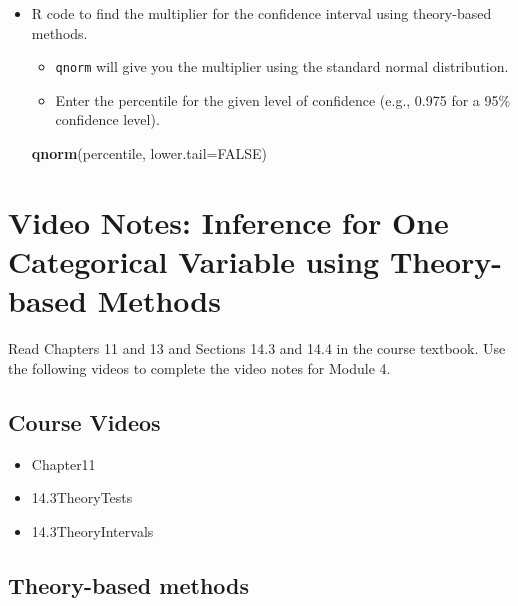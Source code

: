 \documentclass[
]{report}
\newenvironment{Shaded}{\begin{snugshade}}{\end{snugshade}}
\newcommand{\AttributeTok}[1]{\textcolor[rgb]{0.13,0.29,0.53}{#1}}
\newcommand{\ConstantTok}[1]{\textcolor[rgb]{0.56,0.35,0.01}{#1}}
\newcommand{\FunctionTok}[1]{\textcolor[rgb]{0.13,0.29,0.53}{\textbf{#1}}}
\newcommand{\NormalTok}[1]{#1}
\begin{document}
\begin{itemize}
\item
  R code to find the multiplier for the confidence interval using theory-based methods.

  \begin{itemize}
  \item
    \texttt{qnorm} will give you the multiplier using the standard normal distribution.
  \item
    Enter the percentile for the given level of confidence (e.g., 0.975 for a 95\% confidence level).
  \end{itemize}

\begin{Shaded}
\begin{Highlighting}[]
\FunctionTok{qnorm}\NormalTok{(percentile, }\AttributeTok{lower.tail=}\ConstantTok{FALSE}\NormalTok{)}
\end{Highlighting}
\end{Shaded}
\end{itemize}

\newpage

\section{Video Notes: Inference for One Categorical Variable using Theory-based Methods}\label{video-notes-inference-for-one-categorical-variable-using-theory-based-methods}

Read Chapters 11 and 13 and Sections 14.3 and 14.4 in the course textbook. Use the following videos to complete the video notes for Module 4.

\subsection{Course Videos}\label{course-videos-3}

\begin{itemize}
\item
  Chapter11
\item
  14.3TheoryTests
\item
  14.3TheoryIntervals
\end{itemize}


\subsection*{Theory-based methods}\label{theory-based-methods}
\end{document}
